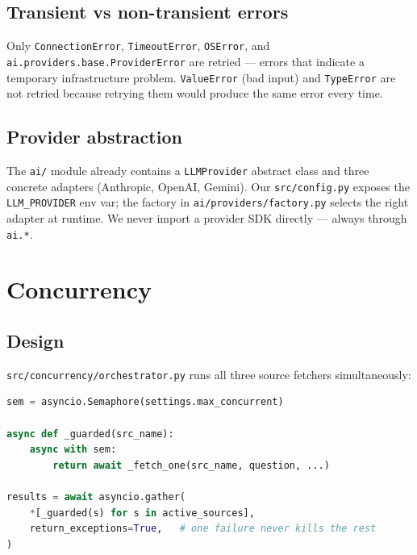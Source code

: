 \documentclass[12pt,a4paper]{article}
\begin{document}
\subsection{Transient vs non-transient errors}

Only \texttt{ConnectionError}, \texttt{TimeoutError}, \texttt{OSError}, and
\texttt{ai.providers.base.ProviderError} are retried — errors that indicate a temporary
infrastructure problem. \texttt{ValueError} (bad input) and \texttt{TypeError} are not retried
because retrying them would produce the same error every time.

\subsection{Provider abstraction}

The \texttt{ai/} module already contains a \texttt{LLMProvider} abstract class and three
concrete adapters (Anthropic, OpenAI, Gemini). Our \texttt{src/config.py} exposes the
\texttt{LLM\_PROVIDER} env var; the factory in \texttt{ai/providers/factory.py} selects the
right adapter at runtime. We never import a provider SDK directly — always through \texttt{ai.*}.

\section{Concurrency}
\label{sec:concurrency}

\subsection{Design}

\texttt{src/concurrency/orchestrator.py} runs all three source fetchers simultaneously:

\begin{lstlisting}[language=Python, caption=Concurrent orchestration with graceful degradation]
sem = asyncio.Semaphore(settings.max_concurrent)

async def _guarded(src_name):
    async with sem:
        return await _fetch_one(src_name, question, ...)

results = await asyncio.gather(
    *[_guarded(s) for s in active_sources],
    return_exceptions=True,   # one failure never kills the rest
)
\end{lstlisting}
\end{document}
